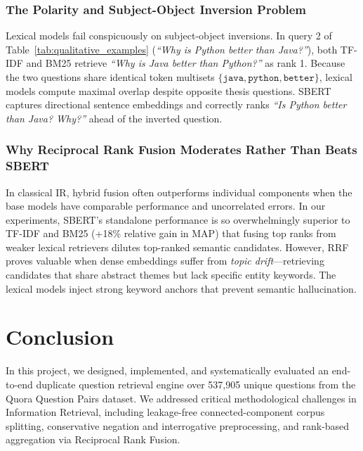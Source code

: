 \documentclass[11pt,a4paper]{article}
\begin{document}
\subsubsection{The Polarity and Subject-Object Inversion Problem}
Lexical models fail conspicuously on subject-object inversions. In query 2 of Table~\ref{tab:qualitative_examples} (\textit{``Why is Python better than Java?''}), both TF-IDF and BM25 retrieve \textit{``Why is Java better than Python?''} as rank 1. Because the two questions share identical token multisets $\{\mathtt{java}, \mathtt{python}, \mathtt{better}\}$, lexical models compute maximal overlap despite opposite thesis questions. SBERT captures directional sentence embeddings and correctly ranks \textit{``Is Python better than Java? Why?''} ahead of the inverted question.

\subsubsection{Why Reciprocal Rank Fusion Moderates Rather Than Beats SBERT}
In classical IR, hybrid fusion often outperforms individual components when the base models have comparable performance and uncorrelated errors. In our experiments, SBERT's standalone performance is so overwhelmingly superior to TF-IDF and BM25 (+18\% relative gain in MAP) that fusing top ranks from weaker lexical retrievers dilutes top-ranked semantic candidates. However, RRF proves valuable when dense embeddings suffer from \textit{topic drift}---retrieving candidates that share abstract themes but lack specific entity keywords. The lexical models inject strong keyword anchors that prevent semantic hallucination.

\newpage

\section{Conclusion}
\label{sec:conclusion}

In this project, we designed, implemented, and systematically evaluated an end-to-end duplicate question retrieval engine over 537,905 unique questions from the Quora Question Pairs dataset. We addressed critical methodological challenges in Information Retrieval, including leakage-free connected-component corpus splitting, conservative negation and interrogative preprocessing, and rank-based aggregation via Reciprocal Rank Fusion.
\end{document}

